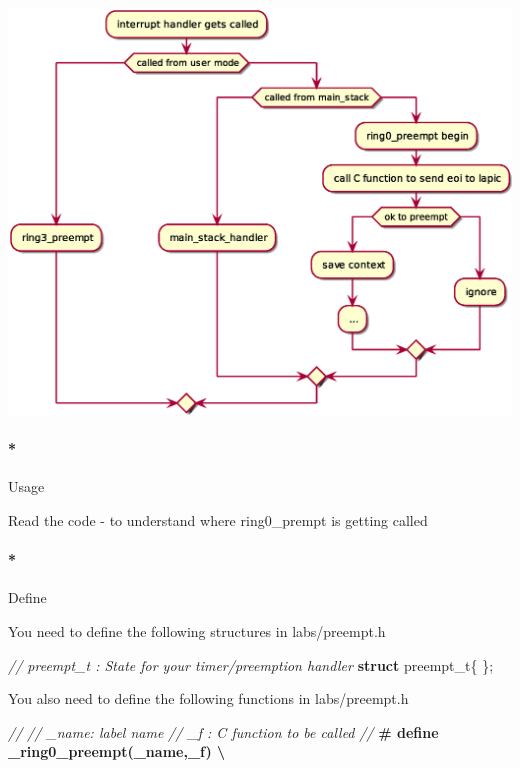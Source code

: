 \documentclass[]{article}
\newenvironment{Shaded}{}{}
\newcommand{\KeywordTok}[1]{\textbf{{#1}}}
\newcommand{\CommentTok}[1]{\textcolor[rgb]{0.50,0.50,0.50}{\textit{{#1}}}}
\newcommand{\PreprocessorTok}[1]{\textbf{{#1}}}
\newcommand{\NormalTok}[1]{{#1}}
\let\oldparagraph\paragraph
\renewcommand{\paragraph}[1]{\oldparagraph{#1}\mbox{}}
\begin{document}
\includegraphics{plantuml-images/3a92be50adfe22414c4435e355e64cfe7d5cf7e1.eps}

\paragraph*{Usage}\label{usage-7}

Read the code - to understand where ring0\_prempt is getting called

\paragraph*{Define}\label{define-7}

You need to define the following structures in labs/preempt.h

\begin{Shaded}
\begin{Highlighting}[]
   \CommentTok{// preempt_t : State for your timer/preemption handler}
   \KeywordTok{struct} \NormalTok{preempt_t\{}
   \NormalTok{\};}
\end{Highlighting}
\end{Shaded}

You also need to define the following functions in labs/preempt.h

\begin{Shaded}
\begin{Highlighting}[]
   \CommentTok{//}
   \CommentTok{// _name: label name}
   \CommentTok{// _f   : C function to be called}
   \CommentTok{//}
   \PreprocessorTok{#  define  _ring0_preempt(_name,_f)            \textbackslash{}}
\end{Highlighting}
\end{Shaded}
\end{document}
